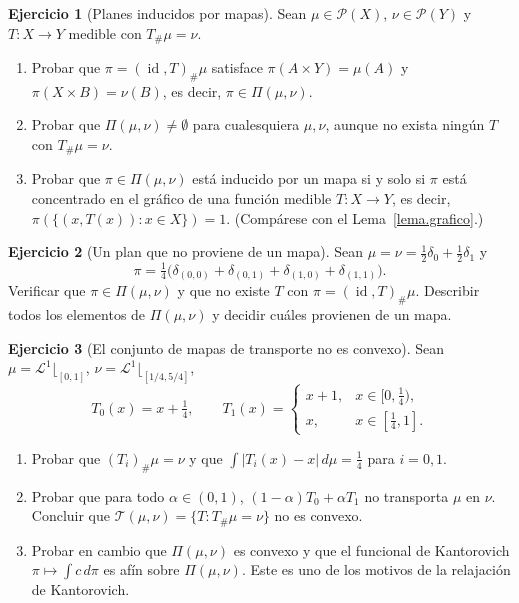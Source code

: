 \documentclass[12pt, a4paper]{amsbook}
\newcommand{\id}{\operatorname{id}}
\newcommand{\LL}{{\mathcal L}}
\theoremstyle{remark}
\theoremstyle{definition}
\newtheorem{ejercicio}{Ejercicio}[chapter]
\numberwithin{section}{chapter}
\numberwithin{subsection}{section}
\numberwithin{equation}{section}
\numberwithin{figure}{chapter}
\begin{document}
\begin{ejercicio}[Planes inducidos por mapas]\label{ejer.plan.inducido}
Sean $\mu\in\mathcal P(X)$, $\nu\in\mathcal P(Y)$ y $T\colon X\to Y$ medible
con $T_\#\mu=\nu$.
\begin{enumerate}[label=(\alph*)]
\item Probar que $\pi=(\id,T)_\#\mu$ satisface $\pi(A\times Y)=\mu(A)$ y
$\pi(X\times B)=\nu(B)$, es decir, $\pi\in\Pi(\mu,\nu)$.
\item Probar que $\Pi(\mu,\nu)\ne\emptyset$ para cualesquiera $\mu,\nu$,
aunque no exista ningún $T$ con $T_\#\mu=\nu$.
\item Probar que $\pi\in\Pi(\mu,\nu)$ está inducido por un mapa si y solo si
$\pi$ está concentrado en el gráfico de una función medible $T\colon X\to Y$,
es decir, $\pi(\{(x,T(x)):x\in X\})=1$. (Compárese con el
Lema~\ref{lema.grafico}.)
\end{enumerate}
\end{ejercicio}

\begin{ejercicio}[Un plan que no proviene de un mapa]\label{ejer.plan.no.mapa}
Sean $\mu=\nu=\frac12\delta_0+\frac12\delta_1$ y
\[
\pi=\tfrac14\bigl(\delta_{(0,0)}+\delta_{(0,1)}+\delta_{(1,0)}+\delta_{(1,1)}\bigr).
\]
Verificar que $\pi\in\Pi(\mu,\nu)$ y que no existe $T$ con
$\pi=(\id,T)_\#\mu$. Describir todos los elementos de $\Pi(\mu,\nu)$ y
decidir cuáles provienen de un mapa.
\end{ejercicio}

\begin{ejercicio}[El conjunto de mapas de transporte no es convexo]\label{ejer.mapas.no.convexo}
Sean $\mu=\LL^1\lfloor_{[0,1]}$, $\nu=\LL^1\lfloor_{[1/4,5/4]}$,
\[
T_0(x)=x+\tfrac14,
\qquad
T_1(x)=\begin{cases}x+1,&x\in[0,\tfrac14),\\ x,&x\in[\tfrac14,1].\end{cases}
\]
\begin{enumerate}[label=(\alph*)]
\item Probar que $(T_i)_\#\mu=\nu$ y que $\int|T_i(x)-x|\,d\mu=\tfrac14$
para $i=0,1$.
\item Probar que para todo $\alpha\in(0,1)$, $(1-\alpha)T_0+\alpha T_1$ no
transporta $\mu$ en $\nu$. Concluir que
$\mathcal T(\mu,\nu)=\{T:T_\#\mu=\nu\}$ no es convexo.
\item Probar en cambio que $\Pi(\mu,\nu)$ es convexo y que el funcional de
Kantorovich $\pi\mapsto\int c\,d\pi$ es afín sobre $\Pi(\mu,\nu)$. Este es
uno de los motivos de la relajación de Kantorovich.
\end{enumerate}
\end{ejercicio}
\end{document}
